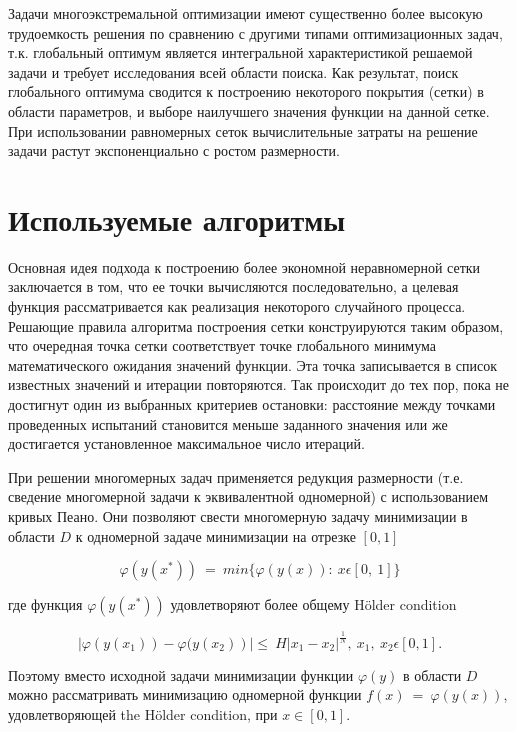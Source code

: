 \documentclass{svproc}
\begin{document}
Задачи многоэкстремальной оптимизации имеют существенно более высокую трудоемкость решения по сравнению с другими типами оптимизационных задач, т.к. глобальный оптимум является интегральной характеристикой решаемой задачи и требует исследования всей области поиска. Как результат, поиск глобального оптимума сводится к построению некоторого покрытия (сетки) в области параметров, и выборе наилучшего значения функции на данной сетке. При использовании равномерных сеток вычислительные затраты на решение задачи растут экспоненциально с ростом размерности.

\section{Используемые алгоритмы}\label{SecA}

Основная идея подхода к построению более экономной неравномерной сетки заключается в том, что ее точки вычисляются последовательно, а целевая функция рассматривается как реализация некоторого случайного процесса. Решающие правила алгоритма построения сетки конструируются таким образом, что очередная точка сетки соответствует точке глобального минимума математического ожидания значений функции. Эта точка записывается в список известных значений и итерации повторяются. Так происходит до тех пор, пока не достигнут один из выбранных критериев остановки: расстояние между точками проведенных испытаний становится меньше заданного значения или же достигается установленное максимальное число итераций. \cite{fio_bib10}

При решении многомерных задач применяется редукция размерности (т.е. сведение многомерной задачи к эквивалентной одномерной) с использованием кривых Пеано. Они позволяют свести многомерную задачу минимизации в области $D$  к одномерной задаче минимизации на отрезке $[0, 1]$

\begin{displaymath}
\varphi(y(x^\ast))\ =\ min\{\varphi(y(x)):\ x\epsilon[0,\ 1]\}
\end{displaymath}

где функция $\varphi(y(x^\ast))$  удовлетворяют более общему H{\"o}lder condition

\begin{displaymath}
\left|\varphi (y \left(x_1\right))- \varphi (y \left(x_2\right)\right )|\le\ H\left|x_1-x_2\right|^\frac{1}{N},\ x_1,\ x_2\epsilon[0,1].
\end{displaymath}

Поэтому вместо исходной задачи минимизации функции $\varphi(y)$ в области $D$ можно рассматривать минимизацию одномерной функции $f(x)\ =\ \varphi(y(x))$, удовлетворяющей the H{\"o}lder condition, при $ x\in [0,1]$.
\end{document}
